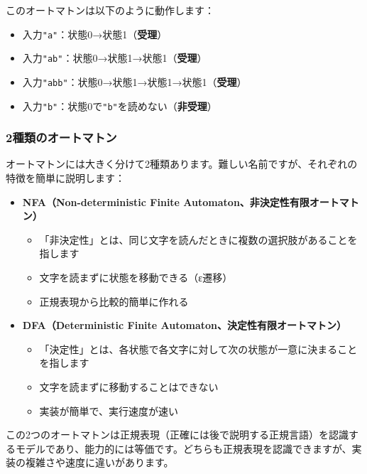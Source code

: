 このオートマトンは以下のように動作します：

\begin{itemize}
\tightlist
\item
  入力\verb|"a"|：状態0→状態1（\textbf{受理}）
\item
  入力\verb|"ab"|：状態0→状態1→状態1（\textbf{受理}）
\item
  入力\verb|"abb"|：状態0→状態1→状態1→状態1（\textbf{受理}）
\item
  入力\verb|"b"|：状態0で\verb|"b"|を読めない（\textbf{非受理}）
\end{itemize}

\hypertarget{chapter4-ux7a2eux985eux306eux30aaux30fcux30c8ux30deux30c8ux30f3}{%
\subsubsection{2種類のオートマトン}\label{chapter4-ux7a2eux985eux306eux30aaux30fcux30c8ux30deux30c8ux30f3}}

オートマトンには大きく分けて2種類あります。難しい名前ですが、それぞれの特徴を簡単に説明します：

\begin{itemize}
\tightlist
\item
  \textbf{NFA（Non-deterministic Finite
  Automaton、非決定性有限オートマトン）}

  \begin{itemize}
  \tightlist
  \item
    「非決定性」とは、同じ文字を読んだときに複数の選択肢があることを指します
  \item
    文字を読まずに状態を移動できる（ε遷移）
  \item
    正規表現から比較的簡単に作れる
  \end{itemize}
\item
  \textbf{DFA（Deterministic Finite Automaton、決定性有限オートマトン）}

  \begin{itemize}
  \tightlist
  \item
    「決定性」とは、各状態で各文字に対して次の状態が一意に決まることを指します
  \item
    文字を読まずに移動することはできない
  \item
    実装が簡単で、実行速度が速い
  \end{itemize}
\end{itemize}

この2つのオートマトンは正規表現（正確には後で説明する正規言語）を認識するモデルであり、能力的には等価です。どちらも正規表現を認識できますが、実装の複雑さや速度に違いがあります。

